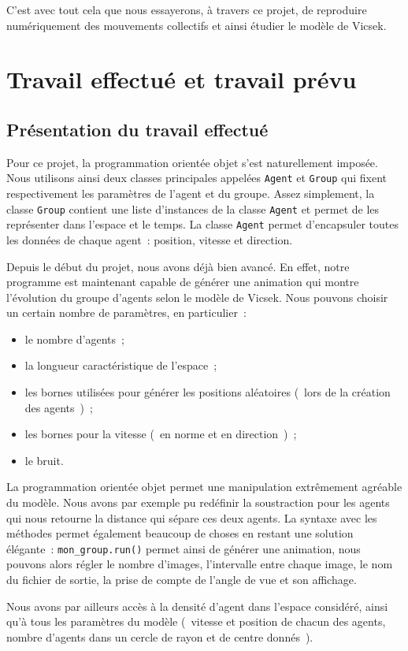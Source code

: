 \documentclass[french, a4paper, 12pt]{article}
\begin{document}
	C'est avec tout cela que nous essayerons, à travers ce projet, de reproduire numériquement des mouvements collectifs et ainsi étudier le modèle de Vicsek.

\section{Travail effectué et travail prévu}
	\subsection{Présentation du travail effectué}
     Pour ce projet, la programmation orientée objet s'est naturellement imposée. Nous utilisons ainsi deux classes principales appelées \verb|Agent| et \verb|Group| qui fixent respectivement les paramètres de l'agent et du groupe. Assez simplement, la classe \verb|Group| contient une liste d'instances de la classe \verb|Agent| et permet de les représenter dans l'espace et le temps. La classe \verb|Agent| permet d'encapsuler toutes les données de chaque agent~: position, vitesse et direction.

     Depuis le début du projet, nous avons déjà bien avancé. En effet, notre programme est maintenant capable de générer une animation qui montre l'évolution du groupe d'agents selon le modèle de Vicsek. Nous pouvons choisir un certain nombre de paramètres, en particulier~:
	 \begin{itemize}
	 	\item le nombre d'agents~;
		\item la longueur caractéristique de l'espace~;
		\item les bornes utilisées pour générer les positions aléatoires (~lors de la création des agents~)~;
		\item les bornes pour la vitesse (~en norme et en direction~)~;
		\item le bruit.
	\end{itemize}
	La programmation orientée objet permet une manipulation extrêmement agréable du modèle. Nous avons par exemple pu redéfinir la soustraction pour les agents qui nous retourne la distance qui sépare ces deux agents. La syntaxe avec les méthodes permet également beaucoup de choses en restant une solution élégante~: \verb|mon_group.run()| permet ainsi de générer une animation, nous pouvons alors régler le nombre d'images, l'intervalle entre chaque image, le nom du fichier de sortie, la prise de compte de l'angle de vue et son affichage. 

	Nous avons par ailleurs accès à la densité d'agent dans l'espace considéré, ainsi qu'à tous les paramètres du modèle (~vitesse et position de chacun des agents, nombre d'agents dans un cercle de rayon et de centre donnés~).
	
\end{document}
